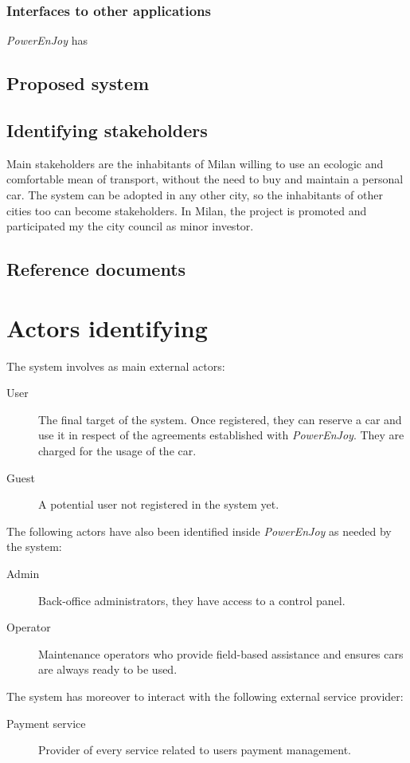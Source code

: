 \documentclass{article}
\begin{document}
			\subsubsection{Interfaces to other applications}
			\textit{PowerEnJoy}  has
						
				  	

		\subsection{Proposed system}

		\subsection{Identifying stakeholders}
			Main stakeholders are the inhabitants of Milan willing to use an ecologic and comfortable mean of transport, without the need to buy and maintain a personal car.
			The system can be adopted in any other city, so the inhabitants of other cities too can become stakeholders.
			In Milan, the project is promoted and participated my the city council as minor investor.

		\subsection{Reference documents}

	\newpage
	\section{Actors identifying}
		The system involves as main external actors:
		\begin{description}
			\item[User] The final target of the system. Once registered, they can reserve a car and use it in respect of the agreements established with \textit{PowerEnJoy}. They are charged for the usage of the car.

			\item[Guest] A potential user not registered in the system yet.
		\end{description}
		The following actors have also been identified inside \textit{PowerEnJoy} as needed by the system:
		\begin{description}
			\item[Admin] Back-office administrators, they have access to a control panel.

			\item[Operator] Maintenance operators who provide field-based assistance and ensures cars are always ready to be used.

		\end{description}
		The system has moreover to interact with the following external service provider:
		\begin{description}
			\item[Payment service] Provider of every service related to users payment management.
		\end{description}
\end{document}

